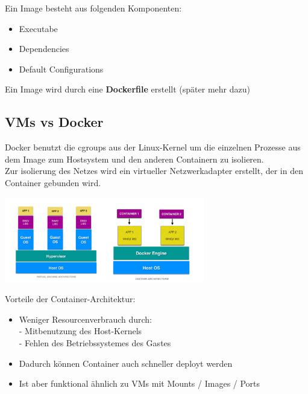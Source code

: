 \begin{frame}
    \slidehead
    \vspace{-1em}
    \Large
    \centering
    Ein Image besteht aus folgenden Komponenten:
    \vspace{1em}
    \begin{itemize}
        \item Executabe
        \item Dependencies
        \item Default Configurations
    \end{itemize}
    \vspace{1em}
    Ein Image wird durch eine \textbf{Dockerfile} erstellt (später mehr dazu)
\end{frame}


\subsection{VMs vs Docker}

\begin{frame}
    \slidehead
    \Large
    Docker benutzt die cgroups aus der Linux-Kernel um die einzelnen Prozesse aus dem Image zum Hostsystem
    und den anderen Containern zu isolieren. \\
    Zur isolierung des Netzes wird ein virtueller Netzwerkadapter erstellt, der in den Container gebunden wird.
\end{frame}

\begin{frame}
    \slidehead
    \vspace{-1em}
    \Large
    \centering
    \includegraphics[height = 10em]{../pictures/docker-vs-vm.png}
\end{frame}

\begin{frame}
    \slidehead
    \Large
    \centering
    Vorteile der Container-Architektur:
    \vspace{1em}
    \begin{itemize}
        \item Weniger Resourcenverbrauch durch: \\
              - Mitbenutzung des Host-Kernels \\
              - Fehlen des Betriebssystemes des Gastes
        \item Dadurch können Container auch schneller deployt werden
        \item Ist aber funktional ähnlich zu VMs mit Mounts / Images / Ports
    \end{itemize}
\end{frame}

